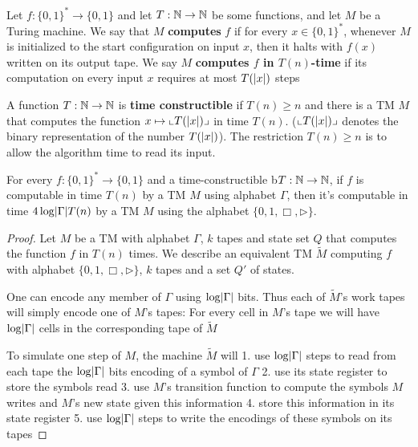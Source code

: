 \documentclass[11pt]{article}
\begin{document}
\begin{definition}
Let \(f:\{0,1\}^*\to\{0,1\}\) and let \(T:\mathbb{N}\to\mathbb{N}\) be some functions, and let \(M\) be a Turing
machine. We say that \(M\) \textbf{computes} \(f\) if for every \(x\in\{0,1\}^*\), whenever \(M\) is
initialized to the start configuration on input \(x\), then it halts with \(f(x)\) written on
its output tape. We say \(M\) \textbf{computes \(f\) in \(T(n)\)-time} if its computation on every
input \(x\) requires at most \(T(\abs{x})\) steps
\end{definition}

A function \(T:\mathbb{N}\to\mathbb{N}\) is \textbf{time constructible} if \(T(n)\ge n\) and there is a TM \(M\) that
computes the function \(x\mapsto\lcorner{T(\abs{x})}\) in time \(T(n)\). (\(\lcorner{T(\abs{x})}\)
denotes the binary representation of the number \(T(\abs{x})\)). The restriction \(T(n)\ge n\) is
to allow the algorithm time to read its input.

\begin{proposition}[]
For every \(f:\{0,1\}^*\to\{0,1\}\) and a time-constructible b\(T:\mathbb{N}\to\mathbb{N}\), if \(f\) is
computable in time \(T(n)\) by a TM \(M\) using alphabet \(\Gamma\), then it's computable in time
\(4\log\abs{\Gamma}T(n)\) by a TM \(M\) using the alphabet \(\{0,1,\Box,\rhd\}\).
\end{proposition}

\begin{proof}
Let \(M\) be a TM with alphabet \(\Gamma\), \(k\) tapes and state set \(Q\) that computes the
function \(f\) in \(T(n)\) times. We describe an equivalent TM \(\tilde{M}\) computing \(f\)
with alphabet \(\{0,1,\Box,\rhd\}\), \(k\) tapes and a set \(Q'\) of states.

One can encode any member of \(\Gamma\) using \(\log\abs{\Gamma}\) bits. Thus each of \(\tilde{M}\)'s work
tapes will simply encode one of \(M\)'s tapes: For every cell in \(M\)'s tape we will
have \(\log\abs{\Gamma}\) cells in the corresponding tape of \(\tilde{M}\)

To simulate one step of \(M\), the machine \(\tilde{M}\) will 1. use \(\log\abs{\Gamma}\) steps to
read from each tape the \(\log\abs{\Gamma}\) bits encoding of a symbol of \(\Gamma\) 2. use its state register
to store the symbols read 3. use \(M\)'s transition function to compute the symbols \(M\) writes
and \(M\)'s new state given this information 4. store this information in its state register 5.
use \(\log\abs{\Gamma}\) steps to write the encodings of these symbols on its tapes
\end{proof}
\end{document}
